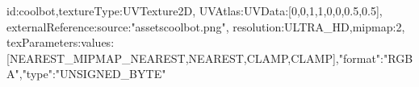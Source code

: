 {id:coolbot,textureType:UVTexture2D,
UVAtlas:{UVData:[0,0,1,1,0,0,0.5,0.5]},
externalReference:{source:"assets\/coolbot.png"},
resolution:ULTRA_HD,mipmap:2,
texParameters:{values:[NEAREST_MIPMAP_NEAREST,NEAREST,CLAMP,CLAMP]},"format":"RGBA","type":"UNSIGNED_BYTE"}